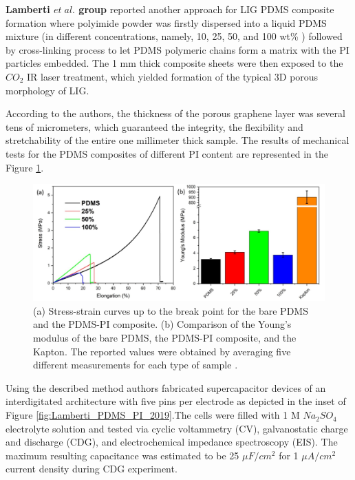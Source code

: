 \textbf{Lamberti $et \; al.$ \cite{parmeggiani_pdmspolyimide_2019} group} reported another approach for LIG PDMS composite formation where polyimide powder was firstly dispersed into a liquid PDMS mixture (in different concentrations, namely, 10, 25, 50, and 100 wt\% ) followed by cross-linking process to let PDMS polymeric chains form a matrix with the PI particles embedded. The 1 mm thick composite sheets were then exposed to the $CO_2$ IR laser treatment, which yielded formation of the typical 3D porous morphology of LIG. 

According to the authors, the thickness of the porous graphene layer was several tens of micrometers, which guaranteed the integrity, the flexibility and stretchability of the entire one millimeter thick sample. The results of mechanical tests for the PDMS composites of different PI content are represented in the Figure \ref{fig:PI_PDMS_Lamberti}.

\begin{figure}[H]
\centering
\includegraphics[width=1\textwidth]{Figures/Theory/PI_PDMS_Lamberti.jpg}
\medskip
\captionsetup{width=0.95\linewidth}
\caption{(a) Stress-strain curves up to the break point for the bare PDMS and the PDMS-PI composite. (b) Comparison of the Young's modulus of the bare PDMS, the PDMS-PI composite, and the Kapton. The reported values were obtained by averaging five different measurements for each
type of sample \cite{parmeggiani_pdmspolyimide_2019}.}
\label{fig:PI_PDMS_Lamberti}
\end{figure}

Using the described method authors fabricated supercapacitor devices of an interdigitated architecture with five pins per electrode as depicted in the inset of Figure \ref{fig:Lamberti_PDMS_PI_2019}.The cells were filled with 1 M $Na_2SO_4$ electrolyte solution and tested via cyclic voltammetry (CV), galvanostatic charge and discharge (CDG), and electrochemical impedance spectroscopy (EIS). The maximum resulting capacitance was estimated to be 25 $\mu F/cm^2$ for 1 $\mu A/cm^2$ current density during CDG experiment. 

